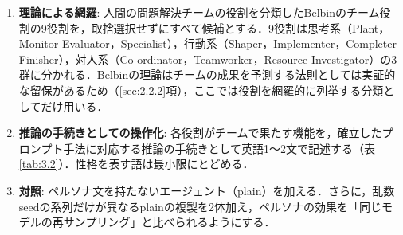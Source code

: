 \begin{enumerate}
\item \textbf{理論による網羅}: 人間の問題解決チームの役割を分類したBelbinのチーム役割\cite{belbin1981management,belbin1993team}の9役割を，取捨選択せずにすべて候補とする．9役割は思考系（Plant，Monitor Evaluator，Specialist），行動系（Shaper，Implementer，Completer Finisher），対人系（Co-ordinator，Teamworker，Resource Investigator）の3群に分かれる．Belbinの理論はチームの成果を予測する法則としては実証的な留保があるため（\ref{sec:2.2.2}項），ここでは役割を網羅的に列挙する分類としてだけ用いる．
\item \textbf{推論の手続きとしての操作化}: 各役割がチームで果たす機能を，確立したプロンプト手法に対応する推論の手続きとして英語1〜2文で記述する（表\ref{tab:3.2}）．性格を表す語は最小限にとどめる．
\item \textbf{対照}: ペルソナ文を持たないエージェント（plain）を加える．さらに，乱数seedの系列だけが異なるplainの複製を2体加え，ペルソナの効果を「同じモデルの再サンプリング」と比べられるようにする．
\end{enumerate}

